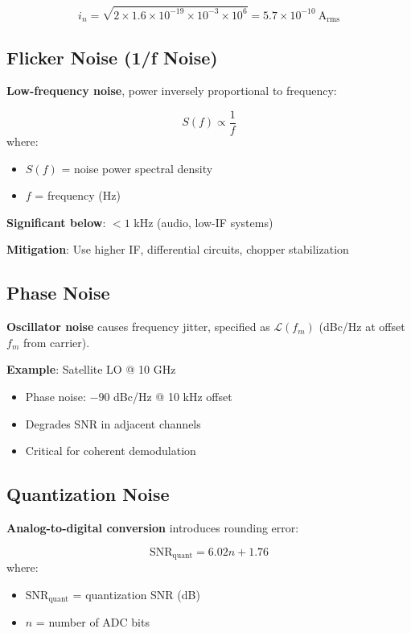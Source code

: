 \begin{equation}
i_n = \sqrt{2 \times 1.6 \times 10^{-19} \times 10^{-3} \times 10^6} = 5.7 \times 10^{-10}~\text{A}_{\text{rms}}
\end{equation}

\subsection{Flicker Noise (1/f Noise)}

\textbf{Low-frequency noise}, power inversely proportional to frequency:

\begin{equation}
S(f) \propto \frac{1}{f}
\end{equation}
where:
\begin{itemize}
\item $S(f)$ = noise power spectral density
\item $f$ = frequency (Hz)
\end{itemize}

\textbf{Significant below}: $< 1$ kHz (audio, low-IF systems)

\textbf{Mitigation}: Use higher IF, differential circuits, chopper stabilization

\subsection{Phase Noise}

\textbf{Oscillator noise} causes frequency jitter, specified as $\mathcal{L}(f_m)$ (dBc/Hz at offset $f_m$ from carrier).

\textbf{Example}: Satellite LO @ 10 GHz
\begin{itemize}
\item Phase noise: $-90$ dBc/Hz @ 10 kHz offset
\item Degrades SNR in adjacent channels
\item Critical for coherent demodulation
\end{itemize}

\subsection{Quantization Noise}

\textbf{Analog-to-digital conversion} introduces rounding error:

\begin{equation}
\text{SNR}_{\text{quant}} = 6.02n + 1.76
\end{equation}
where:
\begin{itemize}
\item $\text{SNR}_{\text{quant}}$ = quantization SNR (dB)
\item $n$ = number of ADC bits
\end{itemize}

